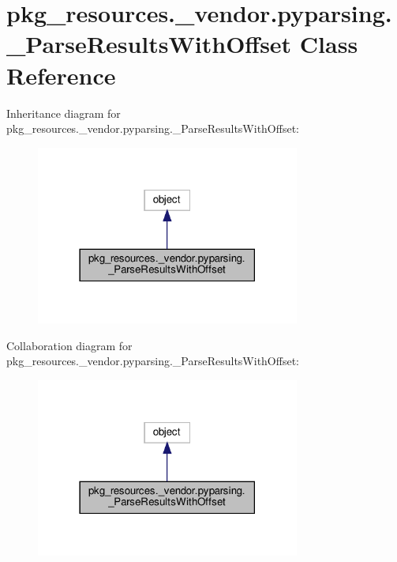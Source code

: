 \hypertarget{classpkg__resources_1_1__vendor_1_1pyparsing_1_1__ParseResultsWithOffset}{}\section{pkg\+\_\+resources.\+\_\+vendor.\+pyparsing.\+\_\+\+Parse\+Results\+With\+Offset Class Reference}
\label{classpkg__resources_1_1__vendor_1_1pyparsing_1_1__ParseResultsWithOffset}


Inheritance diagram for pkg\+\_\+resources.\+\_\+vendor.\+pyparsing.\+\_\+\+Parse\+Results\+With\+Offset\+:
\nopagebreak
\begin{figure}[H]
\begin{center}
\leavevmode
\includegraphics[width=246pt]{classpkg__resources_1_1__vendor_1_1pyparsing_1_1__ParseResultsWithOffset__inherit__graph}
\end{center}
\end{figure}


Collaboration diagram for pkg\+\_\+resources.\+\_\+vendor.\+pyparsing.\+\_\+\+Parse\+Results\+With\+Offset\+:
\nopagebreak
\begin{figure}[H]
\begin{center}
\leavevmode
\includegraphics[width=246pt]{classpkg__resources_1_1__vendor_1_1pyparsing_1_1__ParseResultsWithOffset__coll__graph}
\end{center}
\end{figure}
